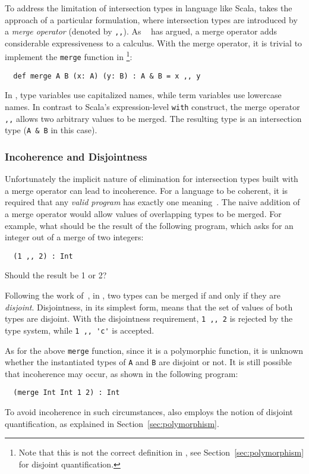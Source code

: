 To address the limitation of intersection types in language like Scala, \name
takes the approach of a particular formulation, where intersection types are
introduced by a \textit{merge operator} (denoted by \lstinline{,,}). As
~\citet{dunfield2014elaborating} has argued, a merge operator adds considerable
expressiveness to a calculus. With the merge operator, it is trivial to
implement the \lstinline{merge} function in \name\footnote{Note that this is not
  the correct definition in \name, see Section~\ref{sec:polymorphism} for
  disjoint quantification.}:
\begin{lstlisting}
  def merge A B (x: A) (y: B) : A & B = x ,, y
\end{lstlisting}
In \name, type variables use capitalized names, while term variables use
lowercase names. In contrast to Scala's expression-level \lstinline{with}
construct, the merge operator \lstinline{,,} allows two arbitrary values to be
merged. The resulting type is an intersection type (\lstinline{A & B} in this
case).

\subsubsection{Incoherence and Disjointness}

Unfortunately the implicit nature of elimination for intersection types built
with a merge operator can lead to incoherence. For a language to be coherent, it
is required that any \textit{valid program} has exactly one
meaning~\cite{reynolds1991coherence}. The naive addition of a merge operator
would allow values of overlapping types to be merged. For example, what should
be the result of the following program, which asks for an integer out of a merge
of two integers:
\begin{lstlisting}
  (1 ,, 2) : Int
\end{lstlisting}
Should the result be 1 or 2?

Following the work of~\citet{oliveira2016disjoint}, in \name, two types can be
merged if and only if they are \textit{disjoint}. Disjointness, in its simplest
form, means that the set of values of both types are disjoint. With the
disjointness requirement, \lstinline{1 ,, 2} is rejected by the type system,
while \lstinline{1 ,, 'c'} is accepted.

As for the above \lstinline{merge} function, since it is a polymorphic function,
it is unknown whether the instantiated types of \lstinline{A} and \lstinline{B}
are disjoint or not. It is still possible that incoherence may occur, as shown
in the following program:
\begin{lstlisting}
  (merge Int Int 1 2) : Int
\end{lstlisting}
To avoid incoherence in such circumstances, \name also employs the notion of
disjoint quantification, as explained in Section~\ref{sec:polymorphism}.

